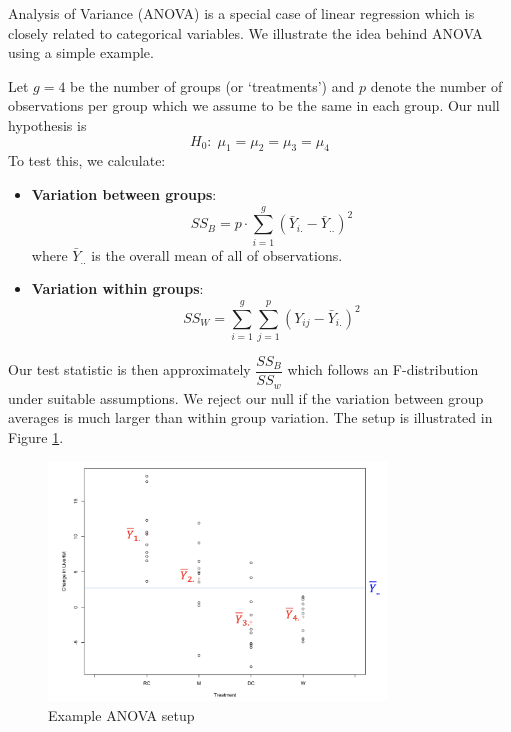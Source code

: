 \documentclass[11pt, %
	oneside, %
	english, %
	onehalfspacing, %
	]{article} %
\numberwithin{equation}{section}
\begin{document}
Analysis of Variance (ANOVA) is a special case of linear regression which is closely related to categorical variables. We illustrate the idea behind ANOVA using a simple example.

Let $g = 4$ be the number of groups (or `treatments') and $p$ denote the number of observations per group which we assume to be the same in each group. Our null hypothesis is
\begin{equation*}
    H_0: \; \mu_1 = \mu_2 = \mu_3 = \mu_4
\end{equation*}
To test this, we calculate:

\begin{itemize}
    \item \textbf{Variation between groups}:
    \begin{equation*}
        S S_B=p \cdot \sum_{i=1}^g\left(\bar{Y}_{i .}-\bar{Y}_{. .}\right)^2
    \end{equation*}
    where $\bar{Y}_{..}$ is the overall mean of all of observations.

    \item \textbf{Variation within groups}:
    \begin{equation*}
        S S_W=\sum_{i=1}^g \sum_{j=1}^p\left(Y_{i j}-\bar{Y}_{i .}\right)^2
    \end{equation*}
\end{itemize}
Our test statistic is then approximately $\dfrac{SS_B}{SS_w}$ which follows an F-distribution under suitable assumptions. We reject our null if the variation between group averages is much larger than within group variation. The setup is illustrated in Figure \ref{fig:anova}.

\begin{figure}
    \caption{Example ANOVA setup}
    \label{fig:anova}
    \begin{center}
        \includegraphics[width = 0.8\textwidth]{anova.png}
    \end{center}
\end{figure}
\end{document}
